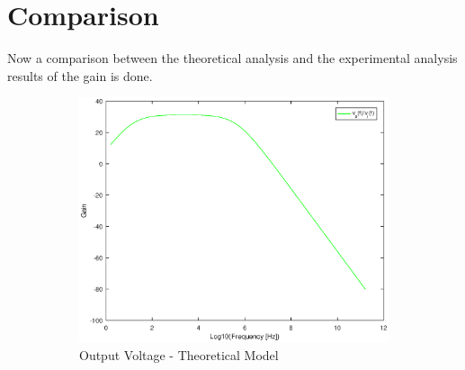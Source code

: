 \section{Comparison}
\label{section:comparison}

\par Now a comparison between the theoretical analysis and the experimental analysis results of the gain is done.
 

\begin{figure}[H]
\centering
\begin{subfigure}{.5\textwidth}
  \centering
  \includegraphics[width=1.1\linewidth]{teoria.eps}
  \caption{Output Voltage - Theoretical Model}
  \label{fig:sim4}
\end{subfigure}
\begin{subfigure}{.5\textwidth}
  \centering

\end{subfigure}
\end{figure}
